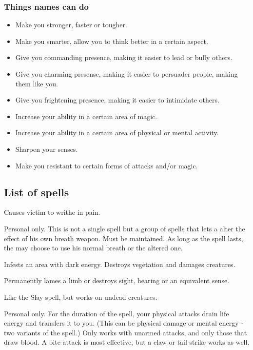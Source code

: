 \subsubsection{Things names can do}
\begin{itemize}
	\item Make you stronger, faster or tougher. 
	\item Make you smarter, allow you to think better in a certain aspect. 
	\item Give you commanding presence, making it easier to lead or bully others. 
	\item Give you charming presense, making it easier to persuader people, making them like you. 
	\item Give you frightening presence, making it easier to intimidate others. 
	\item Increase your ability in a certain area of magic. 
	\item Increase your ability in a certain area of physical or mental activity. 
	\item Sharpen your senses. 
	\item Make you resistant to certain forms of attacks and/or magic. 
\end{itemize}

\subsection{List of \draconic{} spells}
Causes victim to writhe in pain. 

Personal only. This is not a single spell but a group of spells that lets a \dragon{} alter the effect of his own breath weapon. Must be maintained. As long as the spell lasts, the \dragon{} may choose to use his normal breath or the altered one. 

Infests an area with dark energy. Destroys vegetation and damages creatures. 

Permanently lames a limb or destroys sight, hearing or an equivalent sense. 

Like the Slay spell, but works on undead creatures. 

Personal only. For the duration of the spell, your physical attacks drain life energy and transfers it to you. (This can be physical damage or mental energy - two variants of the spell.) Only works with unarmed attacks, and only those that draw blood. A bite attack is most effective, but a claw or tail strike works as well. 

